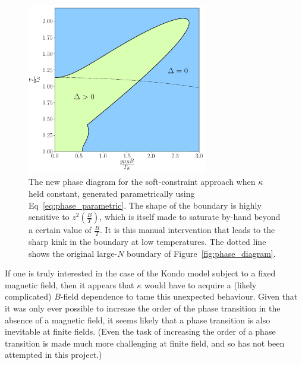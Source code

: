 \begin{figure}
\centering
\includegraphics[width=0.7\textwidth]{Figures/new_phase_diagram.pdf}
\caption{The new phase diagram for the soft-constraint approach when $ \kappa $ held constant, generated parametrically using Eq~\eqref{eq:phase_parametric}. The shape of the boundary is highly sensitive to $ z^2(\frac{B}{T}) $, which is itself made to saturate by-hand beyond a certain value of $ \frac{B}{T}$. It is this manual intervention that leads to the sharp kink in the boundary at low temperatures. The dotted line shows the original large-$N$ boundary of Figure~\ref{fig:phase_diagram}.}
\label{fig:new_phase_boundary}
\end{figure}

If one is truly interested in the case of the Kondo model subject to a fixed magnetic field, then it appears that $ \kappa $ would have to acquire a (likely complicated) $B$-field dependence to tame this unexpected behaviour. Given that it was only ever possible to increase the order of the phase transition in the absence of a magnetic field, it seems likely that a phase transition is also inevitable at finite fields. (Even the task of increasing the order of a phase transition is made much more challenging at finite field, and so has not been attempted in this project.)





